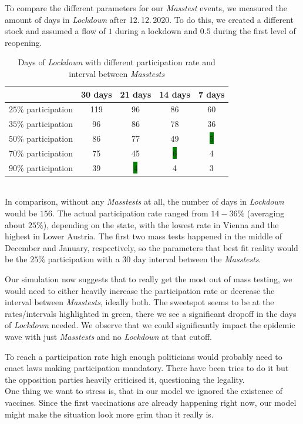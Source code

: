 \documentclass
[
    report,
    11pt,
    bibliography = totoc,
    listof = totoc,
    headinclude = true,
]
{scrreport}
\begin{document}
To compare the different parameters for our \textit{Masstest} events, we measured the amount of days in \textit{Lockdown} after 12.\,12.\,2020. To do this, we created a different stock and assumed a flow of $1$ during a lockdown and $0.5$ during the first level of reopening.
\begin{table}[!h]
{\small%
\begin{center}
\begin{tabular}{|c||c|c|c|c|}
\hline
& 30 days   & 21 days   & 14 days   & 7 days  \\
 \hline
 \hline
     $25\%$ participation & 119 &96 & 86 & 60\\
 \hline
     $35\%$ participation & 96 &  86&  78  & 36   \\
 \hline
     $50\%$ participation & 86 & 77 & 49 & \colorbox{green}{5}\\
 \hline
     $70\%$ participation & 75 &  45 & \colorbox{green}{6} & 4 \\
 \hline
     $90\%$ participation & 39 & \colorbox{green}{4} &4  & 3\\
     \hline
\end{tabular}
\end{center}
}

\caption{Days of \textit{Lockdown} with different participation rate and interval between \textit{Masstests}}
\end{table} \\
In comparison, without any \textit{Masstests} at all, the number of days in \textit{Lockdown} would be $156$. The actual participation rate ranged from $14 - 36\%$ (averaging about $25\%$), depending on the state, with the lowest rate in Vienna and the highest in Lower Austria. The first two mass tests happened in the middle of December and January, respectively, so the parameters that best fit reality would be the $25\%$ participation with a $30$ day interval between the \textit{Masstests}.

Our simulation now suggests that to really get the most out of mass testing, we would need to either heavily increase the participation rate or decrease the interval between \textit{Masstests}, ideally both. The sweetspot seems to be at the rates/intervals highlighted in green, there we see a significant dropoff in the days of \textit{Lockdown} needed. We observe that we could significantly impact the epidemic wave with just \textit{Masstests} and no \textit{Lockdown} at that cutoff.

To reach a participation rate high enough politicians would probably need to enact laws making participation mandatory. There have been tries to do it but the opposition parties heavily criticised it, questioning the legality. \\

One thing we want to stress is, that in our model we ignored the existence of vaccines. Since the first vaccinations are already happening right now, our model might make the situation look more grim than it really is.

\begingroup
\renewcommand{\cleardoublepage}{}
\renewcommand{\clearpage}{}
\printbibliography
\endgroup
\end{document}
